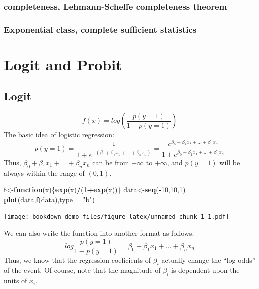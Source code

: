 \documentclass[
]{book}
\newenvironment{Shaded}{\begin{snugshade}}{\end{snugshade}}
\newcommand{\ControlFlowTok}[1]{\textcolor[rgb]{0.13,0.29,0.53}{\textbf{#1}}}
\newcommand{\DataTypeTok}[1]{\textcolor[rgb]{0.13,0.29,0.53}{#1}}
\newcommand{\DecValTok}[1]{\textcolor[rgb]{0.00,0.00,0.81}{#1}}
\newcommand{\KeywordTok}[1]{\textcolor[rgb]{0.13,0.29,0.53}{\textbf{#1}}}
\newcommand{\NormalTok}[1]{#1}
\newcommand{\OperatorTok}[1]{\textcolor[rgb]{0.81,0.36,0.00}{\textbf{#1}}}
\newcommand{\StringTok}[1]{\textcolor[rgb]{0.31,0.60,0.02}{#1}}
\begin{document}
\hypertarget{completeness-lehmann-scheffe-completeness-theorem}{%
\subsection{completeness, Lehmann-Scheffe completeness theorem}\label{completeness-lehmann-scheffe-completeness-theorem}}

\hypertarget{exponential-class-complete-sufficient-statistics}{%
\subsection{Exponential class, complete sufficient statistics}\label{exponential-class-complete-sufficient-statistics}}

\hypertarget{logit-and-probit}{%
\chapter{Logit and Probit}\label{logit-and-probit}}

\hypertarget{logit}{%
\section{Logit}\label{logit}}

\[f(x)=log(\frac{p(y=1)}{1-p(y=1)})\]
The basic idea of logistic regression:
\[p(y=1)=\frac{1}{1+e^{-(\beta_0+\beta_1x_1+...+\beta_nx_n)}}=\frac{e^{\beta_0+\beta_1x_1+...+\beta_nx_n}}{1+e^{\beta_0+\beta_1x_1+...+\beta_nx_n}}\]
Thus, \(\beta_0+\beta_1x_1+...+\beta_nx_n\) can be from \(-\infty\) to \(+\infty\), and \(p(y=1)\) will be always within the range of \((0,1)\).

\begin{Shaded}
\begin{Highlighting}[]
\NormalTok{f<-}\ControlFlowTok{function}\NormalTok{(x)\{}\KeywordTok{exp}\NormalTok{(x)}\OperatorTok{/}\NormalTok{(}\DecValTok{1}\OperatorTok{+}\KeywordTok{exp}\NormalTok{(x))\}}
\NormalTok{data<-}\KeywordTok{seq}\NormalTok{(}\OperatorTok{-}\DecValTok{10}\NormalTok{,}\DecValTok{10}\NormalTok{,}\DecValTok{1}\NormalTok{)}
\KeywordTok{plot}\NormalTok{(data,}\KeywordTok{f}\NormalTok{(data),}\DataTypeTok{type =} \StringTok{"b"}\NormalTok{)}
\end{Highlighting}
\end{Shaded}

\texttt{[image: bookdown-demo\_files/figure-latex/unnamed-chunk-1-1.pdf]}

We can also write the function into another format as follows:
\[log \frac{p(y=1)}{1-p(y=1)}= \beta_0+\beta_1x_1+...+\beta_nx_n\]
Thus, we know that the regression coeficients of \(\beta_i\) actually change the ``log-odds'' of the event. Of course, note that the magnitude of \(\beta_i\) is dependent upon the units of \(x_i\).
\end{document}

